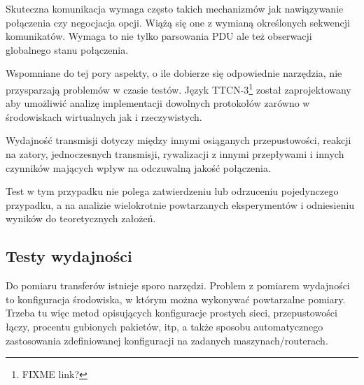 \documentclass[00-praca-magisterska.tex]{subfiles}
\begin{document}
Skuteczna komunikacja wymaga często takich mechanizmów jak nawiązywanie
połączenia czy negocjacja opcji. Wiążą się one z wymianą określonych sekwencji
komunikatów. Wymaga to nie tylko parsowania PDU ale też obserwacji globalnego
stanu połączenia.

Wspomniane do tej pory aspekty, o ile dobierze się odpowiednie narzędzia, nie
przysparzają problemów w czasie testów. Język TTCN-3\footnote{FIXME link?}
został zaprojektowany aby umożliwić analizę implementacji dowolnych protokołów
zarówno w środowiskach wirtualnych jak i rzeczywistych.

Wydajność transmisji dotyczy między innymi osiąganych przepustowości, reakcji na
zatory, jednoczesnych transmisji, rywalizacji z innymi przepływami i innych
czynników mających wpływ na odczuwalną jakość połączenia.

Test w tym przypadku nie polega zatwierdzeniu lub odrzuceniu pojedynczego
przypadku, a na analizie wielokrotnie powtarzanych eksperymentów i odniesieniu
wyników do teoretycznych założeń.

\subsection{Testy wydajności}

Do pomiaru transferów istnieje sporo narzędzi. Problem z pomiarem
wydajności to konfiguracja środowiska, w którym można wykonywać
powtarzalne pomiary. Trzeba tu więc metod opisujących konfiguracje
prostych sieci, przepustowości łączy, procentu gubionych pakietów, itp,
a także sposobu automatycznego zastosowania zdefiniowanej konfiguracji
na zadanych maszynach/routerach.
\end{document}
